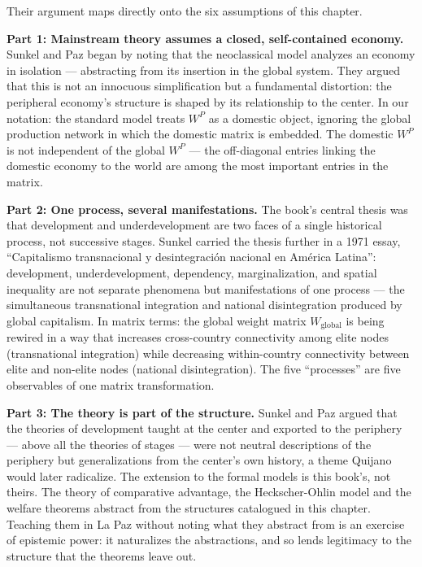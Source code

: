 \documentclass[../structural_economics_book.tex]{subfiles}
\begin{document}
Their argument maps directly onto the six assumptions of this chapter.

\textbf{Part 1: Mainstream theory assumes a closed, self-contained economy.} Sunkel and Paz began by noting that the neoclassical model analyzes an economy in isolation --- abstracting from its insertion in the global system. They argued that this is not an innocuous simplification but a fundamental distortion: the peripheral economy's structure is shaped by its relationship to the center. In our notation: the standard model treats $W^P$ as a domestic object, ignoring the global production network in which the domestic matrix is embedded. The domestic $W^P$ is not independent of the global $W^P$ --- the off-diagonal entries linking the domestic economy to the world are among the most important entries in the matrix.

\textbf{Part 2: One process, several manifestations.} The book's central thesis was that development and underdevelopment are two faces of a single historical process, not successive stages. Sunkel carried the thesis further in a 1971 essay, ``Capitalismo transnacional y desintegraci\'{o}n nacional en Am\'{e}rica Latina'': development, underdevelopment, dependency, marginalization, and spatial inequality are not separate phenomena but manifestations of one process --- the simultaneous transnational integration and national disintegration produced by global capitalism. In matrix terms: the global weight matrix $W_{\text{global}}$ is being rewired in a way that increases cross-country connectivity among elite nodes (transnational integration) while decreasing within-country connectivity between elite and non-elite nodes (national disintegration). The five ``processes'' are five observables of one matrix transformation.

\textbf{Part 3: The theory is part of the structure.} Sunkel and Paz argued that the theories of development taught at the center and exported to the periphery --- above all the theories of stages --- were not neutral descriptions of the periphery but generalizations from the center's own history, a theme Quijano would later radicalize. The extension to the formal models is this book's, not theirs. The theory of comparative advantage, the Heckscher-Ohlin model and the welfare theorems abstract from the structures catalogued in this chapter. Teaching them in La Paz without noting what they abstract from is an exercise of epistemic power: it naturalizes the abstractions, and so lends legitimacy to the structure that the theorems leave out.
\end{document}
